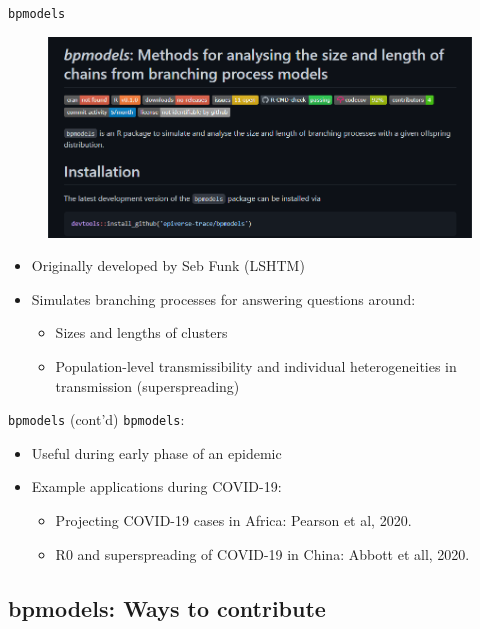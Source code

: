 \documentclass[10pt]{beamer}
\begin{document}
\begin{frame}[fragile]{\texttt{bpmodels}}
\begin{figure}
	\centering
	\includegraphics[scale=0.45]{../figures/bpmodels_homepage.PNG}
\end{figure}
\begin{itemize}
\item Originally developed by Seb Funk (LSHTM)
\item Simulates branching processes for answering questions around:
\begin{itemize}
	\item Sizes and lengths of clusters 
	\item Population-level transmissibility and individual heterogeneities in transmission (superspreading)
\end{itemize}
\end{itemize}
\end{frame}

\begin{frame}[fragile]{\texttt{bpmodels} (cont'd)}
\texttt{bpmodels}:	
\begin{itemize}
\item Useful during early phase of an epidemic
\item Example applications during COVID-19:
\begin{itemize}
	\item Projecting COVID-19 cases in Africa: Pearson et al, 2020.
	\item R0 and superspreading of COVID-19 in China: Abbott et all, 2020.
\end{itemize}
\end{itemize}
\end{frame}

\subsection{bpmodels: Ways to contribute}
\end{document}
